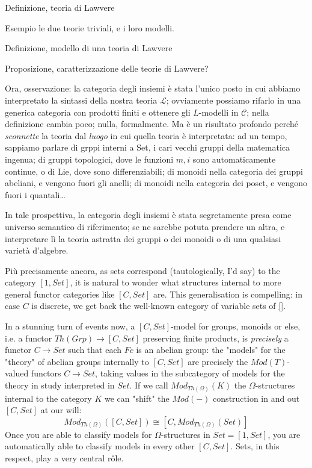 \documentclass{amsart}
\begin{document}
Definizione, teoria di Lawvere

Esempio le due teorie triviali, e i loro modelli.

Definizione, modello di una teoria di Lawvere

Proposizione, caratterizzazione delle teorie di Lawvere?

Ora, osservazione: la categoria degli insiemi è stata l'unico posto in cui abbiamo interpretato la sintassi della nostra teoria $\mathcal L$; ovviamente possiamo rifarlo in una generica categoria con prodotti finiti e ottenere gli $L$-modelli in $\mathcal C$; nella definizione cambia poco; nulla, formalmente. Ma è un risultato profondo perché \emph{sconnette} la teoria dal \emph{luogo} in cui quella teoria è interpretata: ad un tempo, sappiamo parlare di grppi interni a Set, i cari vecchi gruppi della matematica ingenua; di gruppi topologici, dove le funzioni $m,i$ sono automaticamente continue, o di Lie, dove sono differenziabili; di monoidi nella categoria dei gruppi abeliani, e vengono fuori gli anelli;  di monoidi nella categoria dei poset, e vengono fuori i quantali\dots

In tale prospettiva, la categoria degli insiemi è stata segretamente presa come universo semantico di riferimento; se ne sarebbe potuta prendere un altra, e interpretare lì la teoria astratta dei gruppi o dei monoidi o di una qualsiasi varietà d'algebre.

Più precisamente ancora, as sets correspond (tautologically, I'd say) to the category $[1,Set]$, it is natural to wonder what structures internal to more general functor categories like $[C,Set]$ are. This generalisation is compelling: in case $C$ is discrete, we get back the well-known category of variable sets of \ref{}.

In a stunning turn of events now, a $[C,Set]$-model for groups, monoids or else, i.e. a functor $Th(Grp)\to [C,Set]$ preserving finite products, is \emph{precisely} a functor $C\to Set$ such that each $Fc$ is an abelian group: the "models" for the "theory" of abelian groups internally to $[C,Set]$ are precisely the $Mod(T)$-valued functors $C\to Set$, taking values in the subcategory of models for the theory in study interpreted in $Set$. If we call $Mod_{Th(\Omega)}( K)$ the $\Omega$-structures internal to the category $K$ we can "shift" the $Mod(-)$ construction in and out $[C,Set]$ at our will:
$$
  Mod_{Th(\Omega)}([C,Set]) \cong [C, Mod_{Th(\Omega)}(Set)]
$$
Once you are able to classify models for $\Omega$-structures in $Set =[1,Set]$, you are automatically able to classify models in every other $[C,Set]$. Sets, in this respect, play a very central rôle.
\end{document}

